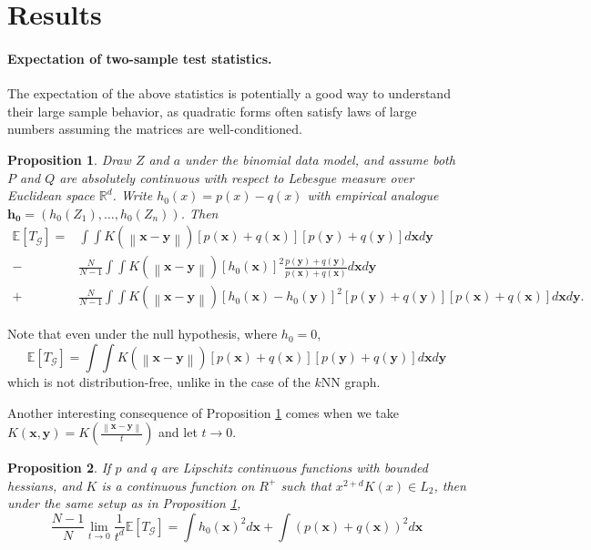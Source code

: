 \documentclass{article}
\newcommand{\Reals}{\mathbb{R}}
\newcommand{\Expect}[1]{\mathbb{E}\left[ #1 \right]}
\newcommand{\norm}[1]{\left\lVert#1\right\rVert}
\newcommand{\x}{\textbf{x}}
\newcommand{\y}{\textbf{y}}
\theoremstyle{alden}
\newtheorem{proposition}{Proposition}
\theoremstyle{definition}
\theoremstyle{remark}
\begin{document}
\section{Results}

\paragraph{Expectation of two-sample test statistics.}

The expectation of the above statistics is potentially a good way to understand their large sample behavior, as quadratic forms often satisfy laws of large numbers assuming the matrices are well-conditioned.

\begin{proposition}
	\label{prop: expectation_of_TG}
	Draw $Z$ and $a$ under the binomial data model, and assume both $P$ and $Q$ are absolutely continuous with respect to Lebesgue measure over Euclidean space $\Reals^d$. Write $h_0(x) = p(x) - q(x)$ with empirical analogue $\mathbf{h_0} = (h_0(Z_1), \ldots, h_0(Z_n) )$. Then
	\begin{align}
	\label{eqn: expectation_of_TG}
	\Expect{T_{\mathcal{G}}} = & \int \int K(\norm{\x - \y}) \left[p(\x) + q(\x)\right] \left[p(\y) + q(\y)\right] d\x d\y \nonumber \\
	- & \frac{N}{N - 1} \int \int K(\norm{\x - \y}) \left[h_0(\x)\right]^2 \frac{p(\y) + q(\y)}{p(\x) + q(\x)} d\x d\y \nonumber \\
	+ & \frac{N}{N - 1} \int \int K(\norm{\x - \y}) \left[h_0(\x) - h_0(\y)\right]^2 \left[p(\y) + q(\y)\right] \left[p(\x) + q(\x)\right] d\x d\y.
	\end{align}
\end{proposition}

Note that even under the null hypothesis, where $h_0 = 0$,
\begin{equation*}
\Expect{T_{\mathcal{G}}} = \int \int K(\norm{\x - \y}) \left[p(\x) + q(\x)\right] \left[p(\y) + q(\y)\right] d\x d\y
\end{equation*}
which is not distribution-free, unlike in the case of the $k$NN graph. 

Another interesting consequence of Proposition \ref{prop: expectation_of_TG} comes when we take $K(\x,\y) = K(\frac{\norm{\x - \y}}{t})$ and let $t \to 0$. 

\begin{proposition}
	\label{prop: expectation_of_TG_with_kde}
	If $p$ and $q$ are Lipschitz continuous functions with bounded hessians, and $K$ is a continuous function on $R^+$ such that $x^{2 + d} K(x) \in L_2$, then under the same setup as in Proposition \ref{prop: expectation_of_TG},
	\begin{equation}
	\label{eqn: expectation_of_TG_with_kde}
	\frac{N - 1}{N}\underset{t \to 0}{\lim} \frac{1}{t^d} \Expect{T_{\mathcal{G}}} = \int  h_0(\x)^2 d\x + \int (p(\x) + q(\x))^2 d\x
	\end{equation}
\end{proposition}
\end{document}
